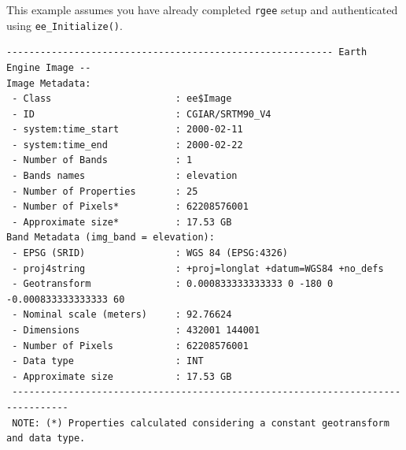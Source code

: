 \documentclass[
  letterpaper,
]{krantz}
\newenvironment{Shaded}{\begin{snugshade}}{\end{snugshade}}
\newcommand{\AttributeTok}[1]{\textcolor[rgb]{0.13,0.29,0.53}{#1}}
\newcommand{\CommentTok}[1]{\textcolor[rgb]{0.56,0.35,0.01}{\textit{#1}}}
\newcommand{\FunctionTok}[1]{\textcolor[rgb]{0.13,0.29,0.53}{\textbf{#1}}}
\newcommand{\NormalTok}[1]{#1}
\newcommand{\OtherTok}[1]{\textcolor[rgb]{0.56,0.35,0.01}{#1}}
\newcommand{\SpecialCharTok}[1]{\textcolor[rgb]{0.81,0.36,0.00}{\textbf{#1}}}
\newcommand{\StringTok}[1]{\textcolor[rgb]{0.31,0.60,0.02}{#1}}
\begin{document}
\begin{tcolorbox}[enhanced jigsaw, leftrule=.75mm, rightrule=.15mm, breakable, opacityback=0, coltitle=black, toprule=.15mm, toptitle=1mm, colbacktitle=quarto-callout-note-color!10!white, bottomrule=.15mm, opacitybacktitle=0.6, arc=.35mm, colback=white, title=\textcolor{quarto-callout-note-color}{\faInfo}\hspace{0.5em}{Note}, colframe=quarto-callout-note-color-frame, titlerule=0mm, bottomtitle=1mm, left=2mm]

This example assumes you have already completed \texttt{rgee} setup and
authenticated using \texttt{ee\_Initialize()}.

\end{tcolorbox}

\begin{Shaded}
\end{Shaded}

\begin{verbatim}
---------------------------------------------------------- Earth Engine Image --
Image Metadata:
 - Class                      : ee$Image
 - ID                         : CGIAR/SRTM90_V4
 - system:time_start          : 2000-02-11
 - system:time_end            : 2000-02-22
 - Number of Bands            : 1
 - Bands names                : elevation
 - Number of Properties       : 25
 - Number of Pixels*          : 62208576001
 - Approximate size*          : 17.53 GB
Band Metadata (img_band = elevation):
 - EPSG (SRID)                : WGS 84 (EPSG:4326)
 - proj4string                : +proj=longlat +datum=WGS84 +no_defs
 - Geotransform               : 0.000833333333333 0 -180 0 -0.000833333333333 60
 - Nominal scale (meters)     : 92.76624
 - Dimensions                 : 432001 144001
 - Number of Pixels           : 62208576001
 - Data type                  : INT
 - Approximate size           : 17.53 GB
 --------------------------------------------------------------------------------
 NOTE: (*) Properties calculated considering a constant geotransform and data type.
\end{verbatim}
\end{document}
